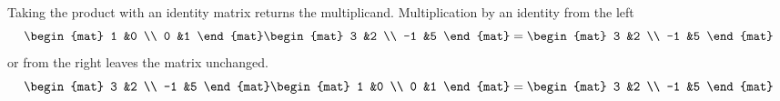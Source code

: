 \documentclass[9pt,t]{beamer}
\begin{document}
\begin{frame}
\df[df:MainDiagonal]
\pause
\df[df:IdentityMatrix]
\pause
Taking the product with an identity matrix returns the multiplicand. 
\ex
Multiplication by an identity from the left
\begin{equation*}
  \begin{mat}
    1  &0 \\
    0  &1
  \end{mat}
  \begin{mat}
    3  &2  \\
   -1  &5
  \end{mat}
  =
  \begin{mat}
    3  &2  \\
   -1  &5
  \end{mat}
\end{equation*}
or from the right leaves the matrix unchanged.
\begin{equation*}
  \begin{mat}
    3  &2  \\
   -1  &5
  \end{mat}
  \begin{mat}
    1  &0 \\
    0  &1
  \end{mat}
  =
  \begin{mat}
    3  &2  \\
   -1  &5
  \end{mat}
\end{equation*}
\end{frame}
\end{document}
